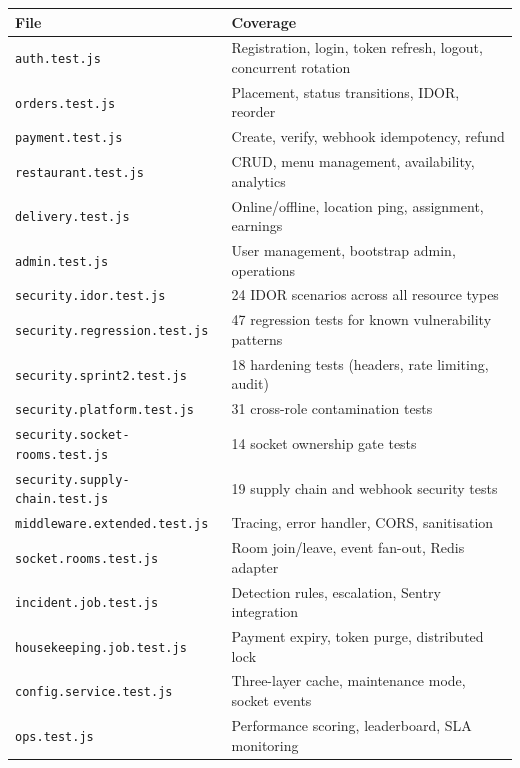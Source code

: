 \documentclass[11pt,a4paper,twoside]{book}
\newcommand{\th}[1]{\textbf{\color{white}#1}}
\begin{document}
\begin{center}\footnotesize
\begin{longtable}{p{5.5cm}p{7cm}}
\toprule
\rowcolor{headbg}\th{File} & \th{Coverage} \\
\midrule
\texttt{auth.test.js}                  & Registration, login, token refresh, logout, concurrent rotation \\
\rowcolor{rowalt}\texttt{orders.test.js}                & Placement, status transitions, IDOR, reorder \\
\texttt{payment.test.js}               & Create, verify, webhook idempotency, refund \\
\rowcolor{rowalt}\texttt{restaurant.test.js}            & CRUD, menu management, availability, analytics \\
\texttt{delivery.test.js}              & Online/offline, location ping, assignment, earnings \\
\rowcolor{rowalt}\texttt{admin.test.js}                 & User management, bootstrap admin, operations \\
\texttt{security.idor.test.js}         & 24 IDOR scenarios across all resource types \\
\rowcolor{rowalt}\texttt{security.regression.test.js}   & 47 regression tests for known vulnerability patterns \\
\texttt{security.sprint2.test.js}      & 18 hardening tests (headers, rate limiting, audit) \\
\rowcolor{rowalt}\texttt{security.platform.test.js}     & 31 cross-role contamination tests \\
\texttt{security.socket-rooms.test.js} & 14 socket ownership gate tests \\
\rowcolor{rowalt}\texttt{security.supply-chain.test.js} & 19 supply chain and webhook security tests \\
\texttt{middleware.extended.test.js}   & Tracing, error handler, CORS, sanitisation \\
\rowcolor{rowalt}\texttt{socket.rooms.test.js}          & Room join/leave, event fan-out, Redis adapter \\
\texttt{incident.job.test.js}          & Detection rules, escalation, Sentry integration \\
\rowcolor{rowalt}\texttt{housekeeping.job.test.js}       & Payment expiry, token purge, distributed lock \\
\texttt{config.service.test.js}        & Three-layer cache, maintenance mode, socket events \\
\rowcolor{rowalt}\texttt{ops.test.js}                   & Performance scoring, leaderboard, SLA monitoring \\
\bottomrule
\end{longtable}
\end{center}
\end{document}
